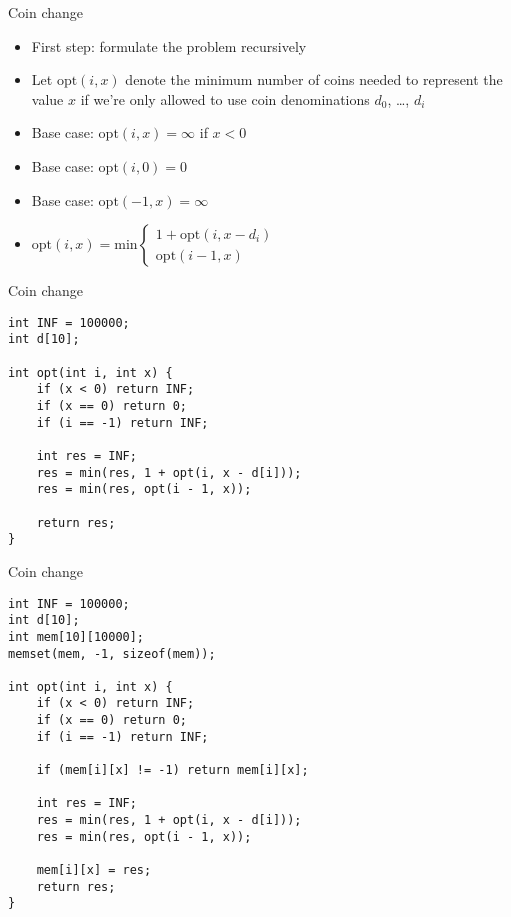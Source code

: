 \documentclass[10pt]{beamer}
\newcommand{\bi}{\begin{itemize}}
\newcommand{\ei}{\end{itemize}}
\begin{document}
\begin{frame}{Coin change}
    \bi
        \item First step: formulate the problem recursively
        \vspace{20pt}
\item Let $\mathrm{opt}(i,x)$ denote the minimum number of coins needed to represent the value $x$ if we're only allowed to use coin denominations $d_0$, \ldots, $d_i$
        \vspace{10pt}
        \item Base case: $\mathrm{opt}(i,x) = \infty$ if $x < 0$
        \item Base case: $\mathrm{opt}(i,0) = 0$
        \item Base case: $\mathrm{opt}(-1,x) = \infty$
        \vspace{10pt}
\item $\mathrm{opt}(i,x) = \mathrm{min} \left\{
	\begin{array}{l}
        1 + \mathrm{opt}(i, x - d_i) \\
        \mathrm{opt}(i-1, x)
	\end{array}
\right.$
    \ei
\end{frame}

\begin{frame}[fragile]{Coin change}
    \begin{verbatim}
int INF = 100000;
int d[10];

int opt(int i, int x) {
    if (x < 0) return INF;
    if (x == 0) return 0;
    if (i == -1) return INF;

    int res = INF;
    res = min(res, 1 + opt(i, x - d[i]));
    res = min(res, opt(i - 1, x));

    return res;
}
    \end{verbatim}
\end{frame}

\begin{frame}[fragile]{Coin change}
    \begin{verbatim}
int INF = 100000;
int d[10];
int mem[10][10000];
memset(mem, -1, sizeof(mem));

int opt(int i, int x) {
    if (x < 0) return INF;
    if (x == 0) return 0;
    if (i == -1) return INF;

    if (mem[i][x] != -1) return mem[i][x];

    int res = INF;
    res = min(res, 1 + opt(i, x - d[i]));
    res = min(res, opt(i - 1, x));

    mem[i][x] = res;
    return res;
}
    \end{verbatim}
\end{frame}
\end{document}
